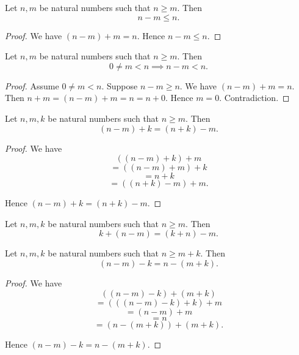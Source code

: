 \documentclass[10pt]{article}
\begin{document}
  \begin{forthel}
    \begin{proposition}
      Let $n, m$ be natural numbers such that $n \geq m$.
      Then \[ n - m \leq n. \]
    \end{proposition}
    \begin{proof}
      We have $(n - m) + m = n$.
      Hence $n - m \leq n$.
    \end{proof}
  \end{forthel}

  \begin{forthel}
    \begin{proposition}
      Let $n, m$ be natural numbers such that $n \geq m$.
      Then \[ 0 \neq m < n \implies n - m < n. \]
    \end{proposition}
    \begin{proof}
      Assume $0 \neq m < n$.
      Suppose $n - m \geq n$.
      We have $(n - m) + m = n$.
      Then $n + m
        = (n - m) + m
        = n
        = n + 0$.
      Hence $m = 0$.
      Contradiction.
    \end{proof}
  \end{forthel}

  \begin{forthel}
    \begin{proposition}
      Let $n, m, k$ be natural numbers such that $n \geq m$.
      Then \[ (n - m) + k = (n + k) - m. \]
    \end{proposition}
    \begin{proof}
      We have
      \[  ((n - m) + k) + m       \]
      \[    = ((n - m) + m) + k   \]
      \[    = n + k               \]
      \[    = ((n + k) - m) + m.  \]

      Hence $(n - m) + k = (n + k) - m$.
    \end{proof}
  \end{forthel}

  \begin{forthel}
    \begin{corollary}
      Let $n, m, k$ be natural numbers such that $n \geq m$.
      Then \[ k + (n - m) = (k + n) - m. \]
    \end{corollary}
  \end{forthel}

  \begin{forthel}
    \begin{proposition}
      Let $n, m, k$ be natural numbers such that $n \geq  m + k$.
      Then \[ (n - m) - k = n - (m + k). \]
    \end{proposition}
    \begin{proof}
      We have
      \[  ((n - m) - k) + (m + k)       \]
      \[    = (((n - m) - k) + k) + m   \]
      \[    = (n - m) + m               \]
      \[    = n                         \]
      \[    = (n - (m + k)) + (m + k).  \]

      Hence $(n - m) - k = n - (m + k)$.
    \end{proof}
  \end{forthel}
\end{document}
